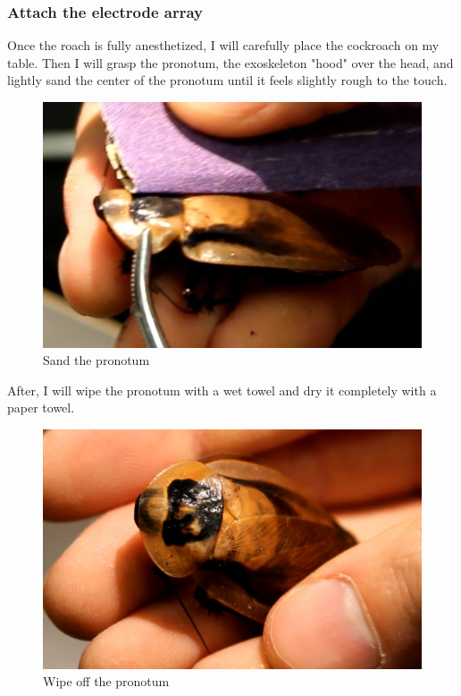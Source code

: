 \subsubsection{Attach the electrode array}
Once the roach is fully anesthetized, I will carefully place the cockroach on my table. Then I will grasp the pronotum, the exoskeleton "hood" over the head, and lightly sand the center of the pronotum until it feels slightly rough to the touch. 
{\begin{figure}[ht!]
\centering
\includegraphics[scale=0.5]{Surgery Photos/sand.jpg}
\caption{Sand the pronotum}
\label{fig:sand}
\end{figure}}
After, I will wipe the pronotum with a wet towel and dry it completely with a paper towel. 
{\begin{figure}[ht!]
\centering
\includegraphics[scale=0.25]{Surgery Photos/wipe.jpg}
\caption{Wipe off the pronotum}
\label{fig:wipe}
\end{figure}}
